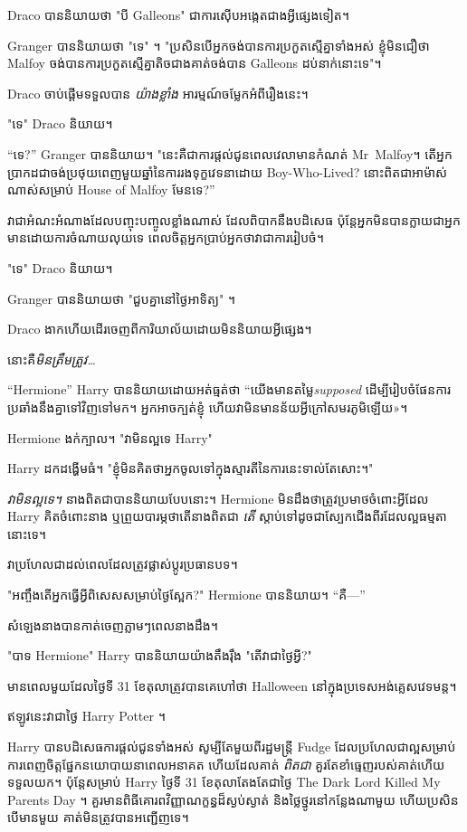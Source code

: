 {Draco បាននិយាយថា "បី Galleons" ជាការស៊ើបអង្កេតជាងអ្វីផ្សេងទៀត។

Granger បាននិយាយថា "ទេ" ។ "ប្រសិន​បើ​អ្នក​ចង់​បាន​ការ​ប្រកួត​ស្មើ​គ្នា​ទាំង​អស់ ខ្ញុំ​មិន​ជឿ​ថា Malfoy ចង់​បាន​ការ​ប្រកួត​ស្មើ​គ្នា​តិច​ជាង​គាត់​ចង់​បាន Galleons ដប់​នាក់​នោះ​ទេ"។

Draco ចាប់ផ្តើមទទួលបាន \emph{យ៉ាងខ្លាំង} អារម្មណ៍ចម្លែកអំពីរឿងនេះ។

"ទេ" Draco និយាយ។

“ទេ?” Granger បាននិយាយ។ "នេះគឺជាការផ្តល់ជូនពេលវេលាមានកំណត់ Mr~Malfoy។ តើ​អ្នក​ប្រាកដ​ជា​ចង់​ប្រថុយ​ពេញ​មួយ​ឆ្នាំ​នៃ​ការ​រង​ទុក្ខ​វេទនា​ដោយ Boy-Who-Lived? នោះពិតជាអាម៉ាស់ណាស់សម្រាប់ House of Malfoy មែនទេ?”

វា​ជា​អំណះអំណាង​ដែល​បញ្ចុះបញ្ចូល​ខ្លាំង​ណាស់ ដែល​ពិបាក​នឹង​បដិសេធ ប៉ុន្តែ​អ្នក​មិន​បាន​ក្លាយ​ជា​អ្នក​មាន​ដោយ​ការ​ចំណាយ​លុយ​ទេ ពេល​ចិត្ត​អ្នក​ប្រាប់​អ្នក​ថា​វា​ជា​ការ​រៀបចំ។

"ទេ" Draco និយាយ។

Granger បាននិយាយថា "ជួបគ្នានៅថ្ងៃអាទិត្យ" ។

Draco ងាកហើយដើរចេញពីការិយាល័យដោយមិននិយាយអ្វីផ្សេង។

នោះគឺ\emph{មិនត្រឹមត្រូវ…}

\later

“Hermione” Harry បាននិយាយដោយអត់ធ្មត់ថា “យើងមានតម្លៃ\emph{supposed} ដើម្បីរៀបចំផែនការប្រឆាំងនឹងគ្នាទៅវិញទៅមក។ អ្នក​អាច​ក្បត់​ខ្ញុំ ហើយ​វា​មិន​មាន​ន័យ​អ្វី​ក្រៅ​សមរភូមិ​ឡើយ»។

Hermione ងក់ក្បាល។ "វាមិនល្អទេ Harry"

Harry ដកដង្ហើមធំ។ "ខ្ញុំ​មិន​គិត​ថា​អ្នក​ចូល​ទៅ​ក្នុង​ស្មារតី​នៃ​ការ​នេះ​ទាល់​តែ​សោះ​។"

\emph{វាមិនល្អទេ។} នាងពិតជាបាននិយាយបែបនោះ។ Hermione មិនដឹងថាត្រូវប្រមាថចំពោះអ្វីដែល Harry គិតចំពោះនាង ឬព្រួយបារម្ភថាតើនាងពិតជា \emph{តើ} ស្តាប់ទៅដូចជាស្បែកជើងពីរដែលល្អធម្មតានោះទេ។

វាប្រហែលជាដល់ពេលដែលត្រូវផ្លាស់ប្តូរប្រធានបទ។

"អញ្ចឹងតើអ្នកធ្វើអ្វីពិសេសសម្រាប់ថ្ងៃស្អែក?" Hermione បាននិយាយ។ “គឺ—”

សំឡេង​នាង​បាន​កាត់​ចេញ​ភ្លាមៗ​ពេល​នាង​ដឹង។

"បាទ Hermione" Harry បាននិយាយយ៉ាងតឹងរ៉ឹង "តើវាជាថ្ងៃអ្វី?"


មានពេលមួយដែលថ្ងៃទី 31 ខែតុលាត្រូវបានគេហៅថា Halloween នៅក្នុងប្រទេសអង់គ្លេសវេទមន្ត។

ឥឡូវនេះវាជាថ្ងៃ Harry Potter ។

Harry បានបដិសេធការផ្តល់ជូនទាំងអស់ សូម្បីតែមួយពីរដ្ឋមន្ត្រី Fudge ដែលប្រហែលជាល្អសម្រាប់ការពេញចិត្តផ្នែកនយោបាយនាពេលអនាគត ហើយដែលគាត់ \emph{ពិតជា} គួរតែខាំធ្មេញរបស់គាត់ហើយទទួលយក។ ប៉ុន្តែសម្រាប់ Harry ថ្ងៃទី 31 ខែតុលាតែងតែជាថ្ងៃ The Dark Lord Killed My Parents Day ។ គួរ​មាន​ពិធី​គោរព​វិញ្ញាណក្ខន្ធ​ដ៏​ស្ងប់ស្ងាត់ និង​ថ្លៃថ្នូរ​នៅ​កន្លែង​ណា​មួយ ហើយ​ប្រសិន​បើ​មាន​មួយ គាត់​មិន​ត្រូវ​បាន​អញ្ជើញ​ទេ។

}
